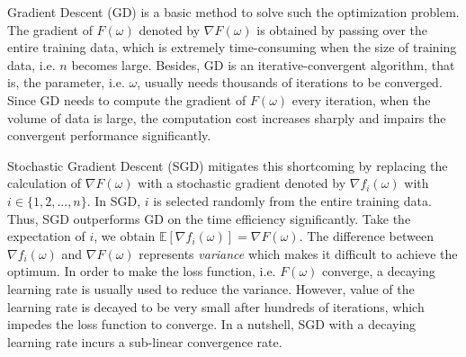 \documentclass[conference]{IEEEtran}
\begin{document}
Gradient Descent (GD) is a basic method to solve such the optimization problem. The gradient of $F(\omega)$ denoted by $\nabla F(\omega)$  is obtained by passing over the entire training data, which is extremely time-consuming when the size of training data, i.e. $n$ becomes large.  Besides, GD is an iterative-convergent algorithm, that is, the parameter, i.e. $\omega$, usually needs thousands of iterations to be converged.   Since GD needs to compute the  gradient of  $F(\omega)$ every iteration, when the volume of data is large, the computation cost increases sharply and impairs the convergent performance significantly. 

Stochastic Gradient Descent (SGD) mitigates this shortcoming by replacing the calculation of $\nabla F(\omega)$ with a stochastic gradient denoted by $\nabla f_i(\omega)$ with $i\in\{1,2, ..., n\}$. In SGD, $i$ is selected randomly  from the entire training data. Thus, SGD outperforms GD on the time efficiency significantly. Take the expectation of $i$, we obtain $\mathbb{E}[\nabla f_i(\omega)] = \nabla F(\omega)$. The difference between $\nabla f_i(\omega)$ and  $\nabla F(\omega)$ represents \emph{variance} which makes it difficult to achieve the optimum.  In order to make the loss function, i.e. $F(\omega)$ converge, a decaying learning rate is usually used to reduce the variance. However, value of the learning rate is decayed to be very small after hundreds of iterations, which impedes the loss function to converge. In a nutshell, SGD with a decaying learning rate incurs a sub-linear convergence rate.

\end{document}

